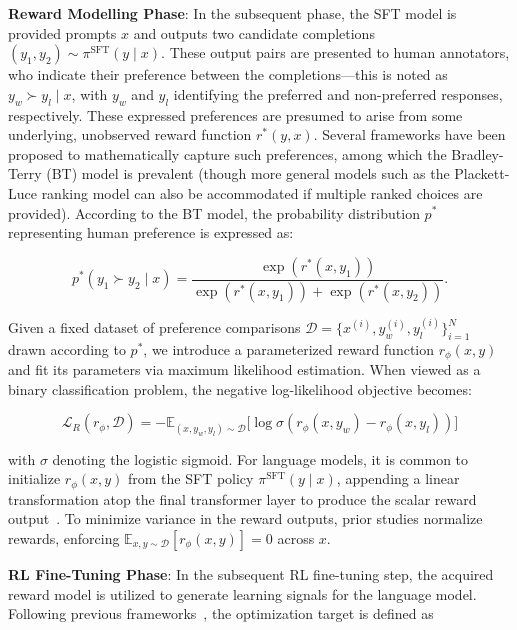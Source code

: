 \textbf{Reward Modelling Phase}: In the subsequent phase, the SFT model is provided prompts $x$ and outputs two candidate completions $(y_1, y_2)\sim \pi^\text{SFT}(y \mid x)$. These output pairs are presented to human annotators, who indicate their preference between the completions—this is noted as $y_w\succ y_l \mid x$, with $y_w$ and $y_l$ identifying the preferred and non-preferred responses, respectively. These expressed preferences are presumed to arise from some underlying, unobserved reward function $r^*(y, x)$. Several frameworks have been proposed to mathematically capture such preferences, among which the Bradley-Terry (BT) \cite{bradley1952rankanalysis} model is prevalent (though more general models such as the Plackett-Luce ranking model \citep{plackett1975analysis, luce2012individual} can also be accommodated if multiple ranked choices are provided). According to the BT model, the probability distribution $p^*$ representing human preference is expressed as:

\begin{equation}\label{eq:bradley-terry}
    p^*(y_1\succ y_2 \mid x)=\frac{\exp\left(r^*(x, y_1)\right)}{\exp\left(r^*(x, y_1)\right) + \exp\left(r^*(x, y_2)\right)}.
\end{equation}

Given a fixed dataset of preference comparisons $\mathcal{D}=\bigl\{x^{(i)}, y_w^{(i)}, y_l^{(i)}\bigr\}_{i=1}^N$ drawn according to $p^*$, we introduce a parameterized reward function $r_{\phi}(x, y)$ and fit its parameters via maximum likelihood estimation. When viewed as a binary classification problem, the negative log-likelihood objective becomes:

\begin{equation}\label{eq:reward_model}
    \mathcal{L}_R(r_{\phi}, \mathcal{D}) = -\mathbb{E}_{(x, y_w, y_l)\sim \mathcal{D}}\bigl[\log \sigma(r_{\phi}(x, y_w)- r_{\phi}(x, y_l))\bigr]
\end{equation}

with $\sigma$ denoting the logistic sigmoid. For language models, it is common to initialize $r_{\phi}(x, y)$ from the SFT policy $\pi^\text{SFT}(y \mid x)$, appending a linear transformation atop the final transformer layer to produce the scalar reward output~\cite{ziegler2020finetuning}. To minimize variance in the reward outputs, prior studies normalize rewards, enforcing $\mathbb{E}_{x,y\sim \mathcal{D}}\left[r_\phi(x, y)\right] = 0$ across $x$.

\textbf{RL Fine-Tuning Phase}: In the subsequent RL fine-tuning step, the acquired reward model is utilized to generate learning signals for the language model. Following previous frameworks~\citep{jaques2017sequence, jaques2020human}, the optimization target is defined as

